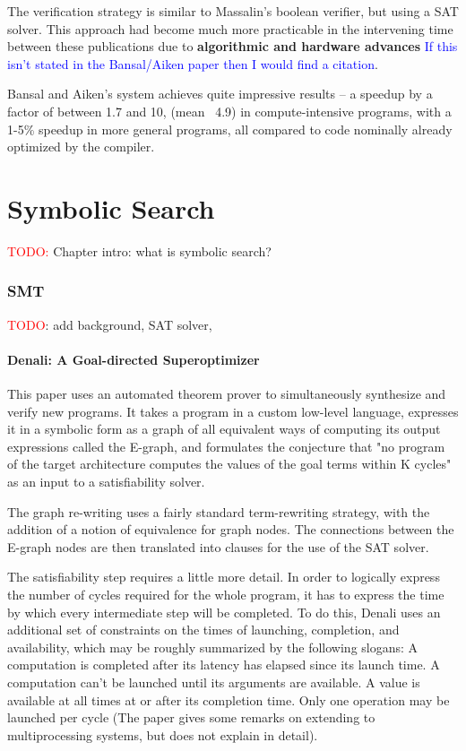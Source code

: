 \documentclass[12pt,twoside]{reedthesis}
\newcommand{\red}[1]{\textcolor{red}{#1}}
\newcommand{\comment}[2]{\textbf{#1} \textcolor{blue}{#2}}
\begin{document}
The verification strategy is similar to Massalin's boolean verifier, but using a SAT solver.
This approach had become much more practicable in the intervening time between these publications due to \comment{algorithmic and hardware advances}{If this isn't stated in the Bansal/Aiken paper then I would find a citation}.

Bansal and Aiken's system achieves quite impressive results 
    -- a speedup by a factor of between 1.7 and 10, (mean ~4.9) in compute-intensive programs, with a 1-5\% speedup in more general programs, all compared to code nominally already optimized by the compiler.

\chapter{Symbolic Search}

\red{TODO:} Chapter intro: what is symbolic search?

\subsection{SMT}

\red{TODO}: add background, SAT solver, 

\subsubsection{Denali: A Goal-directed Superoptimizer}
This paper \cite{joshi2002denali} uses an automated theorem prover to simultaneously synthesize and verify new programs.
It takes a program in a custom low-level language, expresses it in a symbolic form as a graph of all equivalent ways of computing its output expressions called the E-graph, and formulates the conjecture that "no program of the target architecture computes the values of the goal terms within K cycles" as an input to a satisfiability solver. 

The graph re-writing uses a fairly standard term-rewriting strategy, with the addition of a notion of equivalence for graph nodes.
The connections between the E-graph nodes are then translated into clauses for the use of the SAT solver.

The satisfiability step requires a little more detail.
In order to logically express the number of cycles required for the whole program, it has to express the time by which every intermediate step will be completed.
To do this, Denali uses an additional set of constraints on the times of launching, completion, and availability, which may be roughly summarized by the following slogans:
    A computation is completed after its latency has elapsed since its launch time.
    A computation can't be launched until its arguments are available.
    A value is available at all times at or after its completion time.
    Only one operation may be launched per cycle (The paper gives some remarks on extending to multiprocessing systems, but does not explain in detail).
\end{document}
